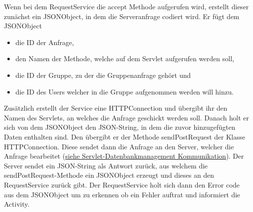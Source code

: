 Wenn bei dem RequestService die accept Methode aufgerufen wird, erstellt dieser zunächst ein JSONObject, in dem die Serveranfrage codiert wird. Er fügt dem JSONObject
\begin{itemize}
\item  die ID der Anfrage,
\item den Namen der Methode, welche auf dem Servlet aufgerufen werden soll,
\item die ID der Gruppe, zu der die Gruppenanfrage gehört und
\item die ID des Users welcher in die Gruppe aufgenommen werden will hinzu.
\end{itemize}
Zusätzlich erstellt der Service eine HTTPConnection und übergibt ihr den Namen des Servlets, an welches die Anfrage geschickt werden soll.
Danach holt er sich von dem JSONObject den JSON-String, in dem die zuvor hinzugefügten Daten enthalten sind. Den übergibt er der Methode sendPostRequest der Klasse HTTPConnection.
Diese sendet dann die Anfrage an den Server, welcher die Anfrage bearbeitet (\hyperlink{ServletDatenbank}{siehe Servlet-Datenbankmanagement Kommunikation}). Der Server sendet ein JSON-String als Antwort zurück, aus welchem die sendPostRequest-Methode ein JSONObject erzeugt und dieses an den RequestService zurück gibt. Der RequestService holt sich dann den Error code aus dem JSONObject um zu erkennen ob ein Fehler auftrat und informiert die Activity.




\hypertarget{ServletDatenbank}{}
